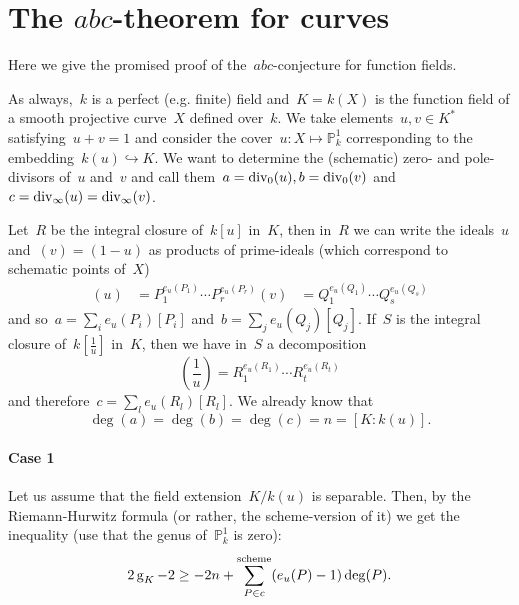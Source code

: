\section{The \texorpdfstring{$abc$}{abc}-theorem for curves}
Here we give the promised proof of the~$abc$-conjecture for function fields.

As always,~$k$ is a perfect (e.g. finite) field and~$K=k(X)$ is the function field of a smooth projective curve~$X$ defined over~$k$. We take elements~$u,v \in K^*$ satisfying~$u+v=1$ and consider the cover~$u\colon X \mapsto \mathbb{P}^1_k$ corresponding to the embedding~$k(u) \hookrightarrow K$. We want to determine the (schematic) zero- and pole-divisors of~$u$ and~$v$ and call them~$a=\operatorname{div}_0(u), b=\operatorname{div}_0(v)$ and~$c=\operatorname{div}_{\infty}(u)=\operatorname{div}_{\infty}(v)$.

Let~$R$ be the integral closure of~$k[u]$ in~$K$, then in~$R$ we can write the ideals~$u$ and~$(v)=(1-u)$ as products of prime-ideals (which correspond to schematic points of~$X$)
\begin{equation}
  \begin{aligned}
    (u) &= P_1^{e_u(P_1)} \cdots P_r^{e_u(P_r)}
    (v) &= Q_1^{e_u(Q_1)} \cdots Q_s^{e_u(Q_s)}
  \end{aligned}
\end{equation}
and so~$a = \sum_i e_u(P_i) [P_i]$ and~$b = \sum_j e_u(Q_j) [Q_j]$. If~$S$ is the integral closure of~$k[\frac{1}{u}]$ in~$K$, then we have in~$S$ a decomposition
\begin{equation}
  \left( \frac{1}{u} \right) = R_1^{e_u(R_1)} \cdots R_t^{e_u(R_t)}
\end{equation}
and therefore~$c = \sum_l e_u(R_l)[R_l]$. We already know that
\begin{equation}
  \deg(a)=\deg(b)=\deg(c)=n=[K : k(u)].
\end{equation}

\paragraph{Case 1} Let us assume that the field extension~$K/k(u)$ is separable. Then, by the Riemann-Hurwitz formula (or rather, the scheme-version of it) we get the inequality (use that the genus of~$\mathbb{P}^1_k$ is zero):
\begin{equation}
  2 \operatorname{g}_K - 2 \geq -2n + \sum^{\textrm{scheme}}_{P \in c} (e_u(P)-1) \deg(P).
\end{equation}

